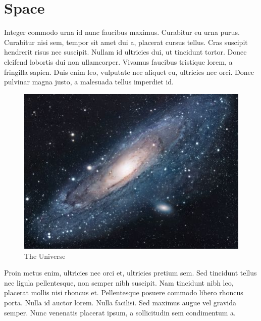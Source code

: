 \section{Space}

 Integer commodo urna id nunc faucibus maximus. Curabitur eu urna purus. Curabitur nisi sem, tempor sit amet dui a, placerat cursus tellus. Cras suscipit hendrerit risus nec suscipit. Nullam id ultricies dui, ut tincidunt tortor. Donec eleifend lobortis dui non ullamcorper. Vivamus faucibus tristique lorem, a fringilla sapien. Duis enim leo, vulputate nec aliquet eu, ultricies nec orci. Donec pulvinar magna justo, a malesuada tellus imperdiet id.

\begin{figure}[!htbp]
\centering
\includegraphics[scale=1.7]{images/universe.jpg}
\caption{The Universe}
\label{fig:universe}
\end{figure}

 Proin metus enim, ultricies nec orci et, ultricies pretium sem. Sed tincidunt tellus nec ligula pellentesque, non semper nibh suscipit. Nam tincidunt nibh leo, placerat mollis nisi rhoncus et. Pellentesque posuere commodo libero rhoncus porta. Nulla id auctor lorem. Nulla facilisi. Sed maximus augue vel gravida semper. Nunc venenatis placerat ipsum, a sollicitudin sem condimentum a.
 
\clearpage
